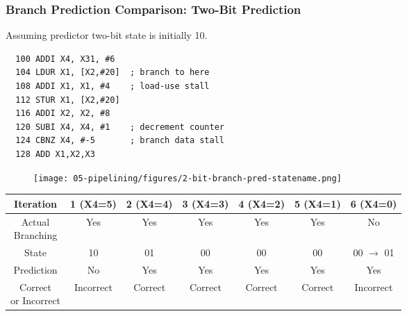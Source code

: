 \begin{frame}[fragile]\frametitle{Branch Prediction Comparison: Two-Bit Prediction}
Assuming predictor two-bit state is initially 10.
\begin{multicols}{2}
{\tiny
\begin{verbatim}
  100 ADDI X4, X31, #6
  104 LDUR X1, [X2,#20]  ; branch to here
  108 ADDI X1, X1, #4    ; load-use stall
  112 STUR X1, [X2,#20]
  116 ADDI X2, X2, #8
  120 SUBI X4, X4, #1    ; decrement counter
  124 CBNZ X4, #-5       ; branch data stall
  128 ADD X1,X2,X3       
\end{verbatim}
}
\columnbreak
\begin{figure}[H]
\centering
	{\texttt{[image: 05-pipelining/figures/2-bit-branch-pred-statename.png]}}
\end{figure}    
\end{multicols}
{\footnotesize
\begin{center}
	\begin{tabular}{c|cccccc}
Iteration &  1 (X4=5) & 2 (X4=4) & 3 (X4=3) & 4 (X4=2) & 5 (X4=1) & 6 (X4=0) \\\hline
\makecell{Actual\\Branching} & Yes & Yes & Yes & Yes & Yes & No\\ \hline
State & 10 & 01 & 00 & 00 & 00 & 00 {$\rightarrow$ 01}\\ \hline
Prediction & No & Yes & Yes & Yes & Yes & Yes \\ \hline
\makecell{Correct \\or Incorrect} & Incorrect & Correct & Correct & Correct & Correct & Incorrect \\ \hline
\end{tabular}
\end{center}
}
\end{frame}

